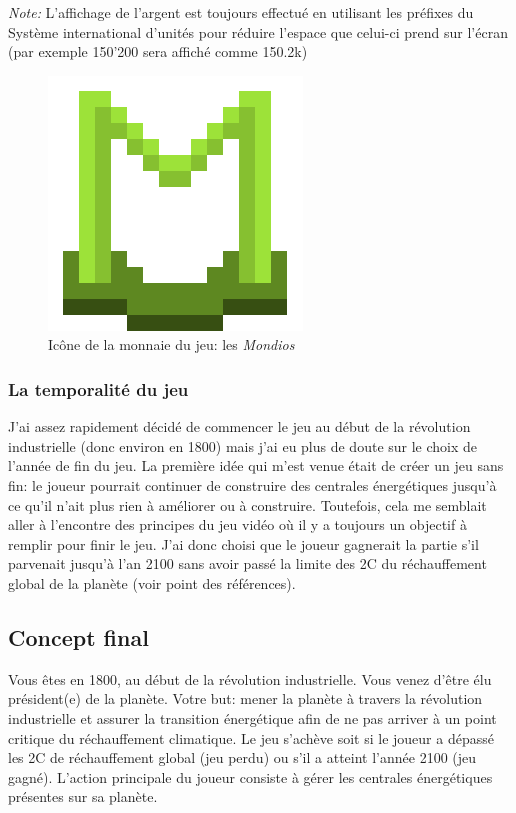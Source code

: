 \documentclass{article}
\begin{document}
		
		\textit{Note: }L'affichage de l'argent est toujours effectué en utilisant les préfixes du Système international d'unités pour réduire l'espace que celui-ci prend sur l'écran (par exemple 150'200 sera affiché comme 150.2k)
		\begin{figure}[H]
                \centerline{\includegraphics[scale=.5]{../images/mondiosLogo}}
                \caption{Icône de la monnaie du jeu: les \textit{Mondios}}
                \label{fig:mondiosLogo}
        \end{figure}
        
        
        \subsubsection{La temporalité du jeu}	
        J'ai assez rapidement décidé de commencer le jeu au début de la révolution industrielle (donc environ en 1800) mais j'ai eu plus de doute sur le choix de l'année de fin du jeu. La première idée qui m'est venue était de créer un jeu sans fin: le joueur pourrait continuer de construire des centrales énergétiques jusqu'à ce qu'il n'ait plus rien à améliorer ou à construire. Toutefois, cela me semblait aller à l'encontre des principes du jeu vidéo où il y a toujours un objectif à remplir pour finir le jeu. J'ai donc choisi que le joueur gagnerait la partie s'il parvenait jusqu'à l'an 2100 sans avoir passé la limite des 2\degree C du réchauffement global de la planète (voir point \cite{objsParis2100} des références).
		
        \subsection{Concept final}
		Vous êtes en 1800, au début de la révolution industrielle. Vous venez d'être élu président(e) de la planète. Votre but: mener la planète à travers la révolution industrielle et assurer la transition énergétique afin de ne pas arriver à un point critique du réchauffement climatique. Le jeu s'achève soit si le joueur a dépassé les 2\degree C de réchauffement global (jeu perdu) ou s'il a atteint l'année 2100 (jeu gagné).
        L'action principale du joueur consiste à gérer les centrales énergétiques présentes sur sa planète.
\end{document}
